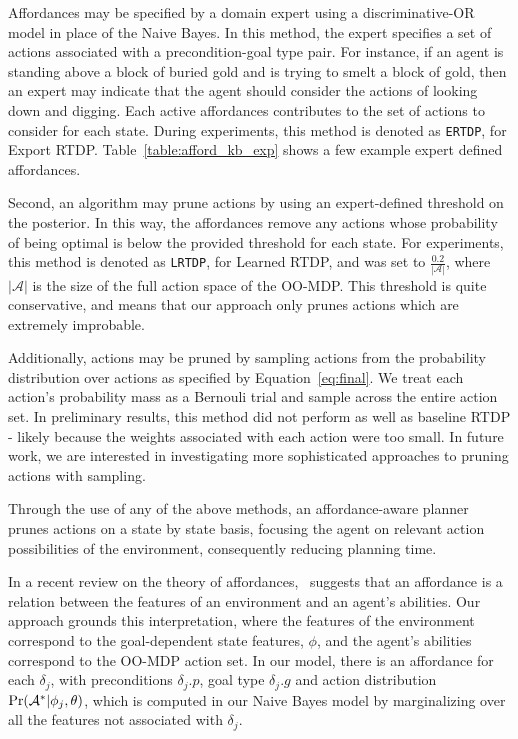 \documentclass[letterpaper]{article}
\begin{document}
Affordances may be specified by a domain expert using a
discriminative-OR model in place of the Naive Bayes. In this method,
the expert specifies a set of actions associated with a
precondition-goal type pair. For instance, if an agent is standing
above a block of buried gold and is trying to smelt a block of gold,
then an expert may indicate that the agent should consider the actions
of looking down and digging. Each active affordances contributes to
the set of actions to consider for each state. During experiments,
this method is denoted as \texttt{ERTDP}, for Export
RTDP. Table~\ref{table:afford_kb_exp} shows a few example expert
defined affordances.


Second, an algorithm may prune actions by using an expert-defined
threshold on the posterior. In this way, the affordances remove any
actions whose probability of being optimal is below the provided
threshold for each state. For experiments, this method is denoted as
\texttt{LRTDP}, for Learned RTDP, and was set to
$\frac{0.2}{|\mathcal{A}|}$, where $|\mathcal{A}|$ is the size of the
full action space of the OO-MDP.  This threshold is quite
conservative, and means that our approach only prunes actions which
are extremely improbable.


Additionally, actions may be pruned by sampling actions from the
probability distribution over actions as specified by
Equation~\ref{eq:final}. We treat each action's probability mass as a
Bernouli trial and sample across the entire action set. In preliminary
results, this method did not perform as well as baseline RTDP - likely
because the weights associated with each action were too small. In
future work, we are interested in investigating more sophisticated
approaches to pruning actions with sampling.

Through the use of any of the above methods, an affordance-aware
planner prunes actions on a state by state basis, focusing the agent
on relevant action possibilities of the environment, consequently
reducing planning time.

In a recent review on the theory of affordances,~\citet{chemero2003}
suggests that an affordance is a relation between the features of an
environment and an agent's abilities. Our approach grounds this
interpretation, where the features of the environment correspond to
the goal-dependent state features, $\phi$, and the agent's abilities
correspond to the OO-MDP action set. In our model, there is an
affordance for each $\delta_j$, with preconditions $\delta_j.p$, goal
type $\delta_j.g$ and action distribution $\Pr({\cal A}^* | \phi_j,
\theta)$, which is computed in our Naive Bayes model by marginalizing
over all the features not associated with $\delta_j$.
\end{document}
